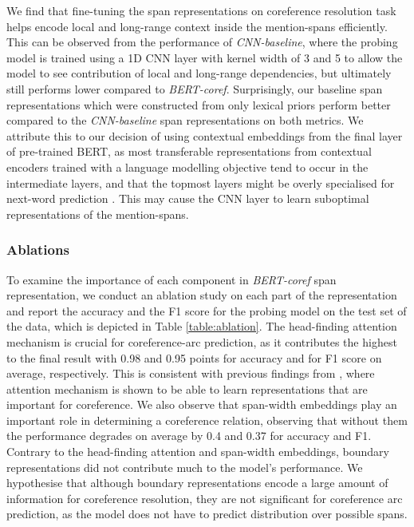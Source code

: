 \documentclass[11pt]{article}
\begin{document}
We find that fine-tuning the span representations on coreference resolution task helps encode local and long-range context inside the mention-spans efficiently. This can be observed from the performance of \textit{CNN-baseline}, where the probing model is trained using a 1D CNN layer with kernel width of 3 and 5 to allow the model to see contribution of local and long-range dependencies, but ultimately still performs lower compared to \textit{BERT-coref}. Surprisingly, our baseline span representations which were constructed from only lexical priors perform better compared to the \textit{CNN-baseline} span representations on both metrics. We attribute this to our decision of using contextual embeddings from the final layer of pre-trained BERT, as most transferable representations from contextual encoders trained with a language modelling objective tend to occur in the intermediate layers, and that the topmost layers might be overly specialised for next-word prediction \parencite{liu2019linguistic,peters2018elmo,peters-etal-2018-dissecting,blevins-etal-2018-deep,devlin2019bert}. This may cause the CNN layer to learn suboptimal representations of the mention-spans.

\subsubsection{Ablations}
To examine the importance of each component in \textit{BERT-coref} span representation, we conduct an ablation study on each part of the representation and report the accuracy and the F1 score for the probing model on the test set of the data, which is depicted in Table \ref{table:ablation}. The head-finding attention mechanism is crucial for coreference-arc prediction, as it contributes the highest to the final result with 0.98 and 0.95 points for accuracy and for F1 score on average, respectively. This is consistent with previous findings from \textcite{lee2017end}, where attention mechanism is shown to be able to learn representations that are important for coreference. We also observe that span-width embeddings play an important role in determining a coreference relation, observing that without them the performance degrades on average by 0.4 and 0.37 for accuracy and F1. Contrary to the head-finding attention and span-width embeddings, boundary representations did not contribute much to the model's performance. We hypothesise that although boundary representations encode a large amount of information for coreference resolution, they are not significant for coreference arc prediction, as the model does not have to predict distribution over possible spans.
\end{document}
